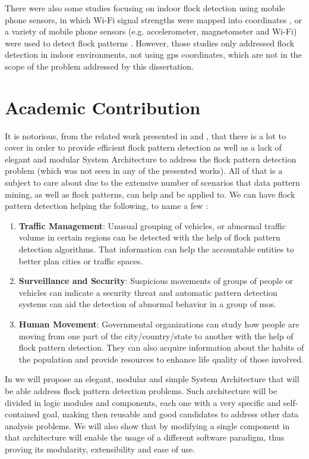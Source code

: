 There were also some studies focusing on indoor flock detection using mobile phone sensors, in which Wi-Fi signal
strengths were mapped into coordinates \citep{mobile1}, or a variety of mobile phone sensors (e.g. accelerometer,
magnetometer and Wi-Fi) were used to detect flock patterns \citep{mobile2}. However, those studies only addressed flock
detection in indoor environments, not using \ac{gps} coordinates, which are not in the scope of the problem addressed by
this dissertation.

\section{Academic Contribution}
It is notorious, from the related work presented in  and , that there is
a lot to cover in order to provide efficient flock pattern detection as well as a lack of elegant and modular System
Architecture to address the flock pattern detection problem (which was not seen in any of the presented works). All of
that is a subject to care about due to the extensive number of scenarios that data pattern mining, as well as flock
patterns, can help and be applied to. We can have flock pattern detection helping the following, to name a few
\citep{applications}:

\begin{enumerate}
    \item \textbf{Traffic Management}: Unusual grouping of vehicles, or abnormal traffic volume in certain regions can
        be detected with the help of flock pattern detection algorithms. That information can help the accountable
        entities to better plan cities or traffic spaces.
    \item \textbf{Surveillance and Security}: Suspicious movements of groups of people or vehicles can indicate a
        security threat and automatic pattern detection systems can aid the detection of abnormal behavior in a group of
        \acp{mo}.
    \item \textbf{Human Movement}: Governmental organizations can study how people are moving from one part of the
        city/country/state to another with the help of flock pattern detection. They can also acquire information about
        the habits of the population and provide resources to enhance life quality of those involved.
\end{enumerate}

In  we will propose an elegant, modular and simple System Architecture that will be able
address flock pattern detection problems. Such architecture will be divided in logic modules and components, each one
with a very specific and self-contained goal, making then reusable and good candidates to address other data analysis
problems. We will also show that by modifying a single component in that architecture will enable the usage of a
different software paradigm, thus proving its modularity, extensibility and ease of use.

